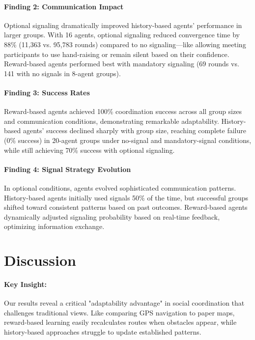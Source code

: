 \documentclass[12pt,a4paper]{article}
\begin{document}
\paragraph{Finding 2: Communication Impact} Optional signaling dramatically improved history-based agents' performance in larger groups. With 16 agents, optional signaling reduced convergence time by 88\% (11,363 vs. 95,783 rounds) compared to no signaling—like allowing meeting participants to use hand-raising or remain silent based on their confidence. Reward-based agents performed best with mandatory signaling (69 rounds vs. 141 with no signals in 8-agent groups).

\paragraph{Finding 3: Success Rates} Reward-based agents achieved 100\% coordination success across all group sizes and communication conditions, demonstrating remarkable adaptability. History-based agents' success declined sharply with group size, reaching complete failure (0\% success) in 20-agent groups under no-signal and mandatory-signal conditions, while still achieving 70\% success with optional signaling.

\paragraph{Finding 4: Signal Strategy Evolution} In optional conditions, agents evolved sophisticated communication patterns. History-based agents initially used signals 50\% of the time, but successful groups shifted toward consistent patterns based on past outcomes. Reward-based agents dynamically adjusted signaling probability based on real-time feedback, optimizing information exchange.

\section{Discussion}

\paragraph{Key Insight:} Our results reveal a critical "adaptability advantage" in social coordination that challenges traditional views. Like comparing GPS navigation to paper maps, reward-based learning easily recalculates routes when obstacles appear, while history-based approaches struggle to update established patterns.
\end{document}
